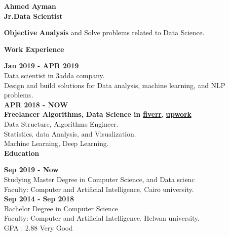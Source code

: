 \documentclass[a4paper,13pt,final]{memoir}
\newcommand{\Sep}{\vspace{1.5em}}
\newcommand{\SmallSep}{\vspace{0.5em}}
\newenvironment{Objective}
	{\ignorespaces\textbf{\color{RoyalBlue} Objective}}
	{\Sep\ignorespacesafterend}
\newcommand{\CVSection}[1]
	{\Large\textbf{#1}\par
	\SmallSep\normalsize\normalfont}
\newcommand{\CVItem}[1]
	{\textbf{\color{RoyalBlue} #1}}
\begin{document}
\Sep
\Sep
\Sep
\Sep
\Sep
\Sep
\Sep
\Sep
\Sep
\Sep
\Sep
\Sep
\Sep
\Sep
\Sep
\Sep
\Sep
\Sep
\Sep
\Sep
\Sep
\Sep
\Sep
\Sep
\Sep
\Sep
\Sep
\Sep
\Sep


\framebreak


\Huge\bfseries {\color{RoyalBlue} Ahmed Ayman} \\
\Large\bfseries   Jr.Data Scientist \\

\normalsize\normalfont

\begin{Objective}
\null\quad \textbf{Analysis} and Solve problems related to Data Science. 

\end{Objective}

\CVSection{Work Experience}
\CVItem{Jan 2019 - APR 2019}\\
Data scientist in 3adda company.\\
Design and build solutions for Data analysis, machine learning, and NLP problems.\\

\CVItem{APR 2018 - NOW}\\
\textbf{Freelancer Algorithms, Data Science in \href{https://www.fiverr.com/ahmedayman777}{fiverr}}, \textbf{\href{https://www.upwork.com/freelancers/~0188612fafd022ba0f}{upwork}} \\
Data Structure, Algorithms Engineer.\\
Statistics, data Analysis, and Visualization.\\
Machine Learning, Deep Learning.\\

\CVSection{Education}
\CVItem{Sep 2019 - Now}\\
Studying Master Degree in Computer Science, and Data scienc\\
Faculty: Computer and Artificial Intelligence, Cairo university.\\

\CVItem{Sep 2014 - Sep 2018}\\
Bachelor Degree in Computer Science\\
Faculty: Computer and Artificial Intelligence, Helwan university.\\
GPA : 2.88 Very Good
\SmallSep
\SmallSep
\Sep
\end{document}
